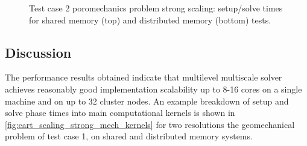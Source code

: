 \begin{figure} [htbp]
  \begin{subfigure}[t]{0.48\textwidth}
    \centering
    
  \end{subfigure}
  \hfill
  \begin{subfigure}[t]{0.48\textwidth}
  \hspace{\textwidth}
  \end{subfigure}
  \begin{subfigure}[t]{0.48\textwidth}
    \centering
    
  \end{subfigure}
  \hfill
  \begin{subfigure}[t]{0.48\textwidth}
    \centering
    
  \end{subfigure}
  \caption[Test case 2 poromechanics problem strong scaling]{Test case 2 poromechanics problem strong scaling: setup/solve times for shared memory (top) and distributed memory (bottom) tests.}
  \label{fig:mazumodel2_scaling_strong_poro}
\end{figure}

\subsection{Discussion}
\label{subsec:par_discussion}

The performance results obtained indicate that multilevel multiscale solver achieves reasonably good implementation scalability up to 8-16 cores on a single machine and on up to 32 cluster nodes.   An example breakdown of setup and solve phase times into main computational kernels is shown in \cref{fig:cart_scaling_strong_mech_kernels} for two resolutions the geomechanical problem of test case 1, on shared and distributed memory systems.

